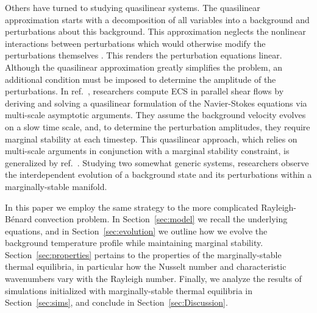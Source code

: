 \documentclass[reprint,amsmath,amssymb,aps,nofootinbib]{revtex4-1}
\renewcommand{\citet}[1]{ref.~\cite{#1}}
\begin{document}
Others have turned to studying quasilinear systems.
The quasilinear approximation starts with a decomposition of all variables into a background and perturbations about this background.
This approximation neglects the nonlinear interactions between perturbations which would otherwise modify the perturbations themselves \cite{marston2016}.
This renders the perturbation equations linear.
Although the quasilinear approximation greatly simplifies the problem, an additional condition must be imposed to determine the amplitude of the perturbations.
In \citet{Beaume_2015}, researchers compute ECS in parallel shear flows by deriving and solving a quasilinear formulation of the Navier-Stokes equations via multi-scale asymptotic arguments. 
They assume the background velocity evolves on a slow time scale, and, to determine the perturbation amplitudes, they require marginal stability at each timestep.
This quasilinear approach, which relies on multi-scale arguments in conjunction with a marginal stability constraint, is generalized by \citet{Chini_ql}.
Studying two somewhat generic systems, researchers observe the interdependent evolution of a background state and its perturbations within a marginally-stable manifold.

In this paper we employ the same strategy to the more complicated Rayleigh-B\'{e}nard convection problem.
In Section~\ref{sec:model} we recall the underlying equations, and in Section~\ref{sec:evolution} we outline how we evolve the background temperature profile while maintaining marginal stability.
Section~\ref{sec:properties} pertains to the properties of the marginally-stable thermal equilibria, in particular how the Nusselt number and characteristic wavenumbers vary with the Rayleigh number.
Finally, we analyze the results of simulations initialized with marginally-stable thermal equilibria in Section~\ref{sec:sims}, and conclude in Section~\ref{sec:Discussion}.
 
\end{document}

